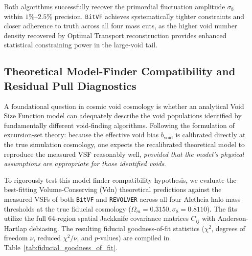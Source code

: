 \documentclass[12pt]{report}
\begin{document}
Both algorithms successfully recover the primordial fluctuation amplitude $\sigma_8$ within $1\%$--$2.5\%$ precision. \texttt{BitVF} achieves systematically tighter constraints and closer adherence to truth across all four mass cuts, as the higher void number density recovered by Optimal Transport reconstruction provides enhanced statistical constraining power in the large-void tail.

\subsection{Theoretical Model-Finder Compatibility and Residual Pull Diagnostics}
\label{sec:model_finder_compatibility}

A foundational question in cosmic void cosmology is whether an analytical Void Size Function model can adequately describe the void populations identified by fundamentally different void-finding algorithms. Following the formulation of excursion-set theory: because the effective void bias $b_{\mathrm{void}}$ is calibrated directly at the true simulation cosmology, one expects the recalibrated theoretical model to reproduce the measured VSF reasonably well, \emph{provided that the model's physical assumptions are appropriate for those identified voids}.

To rigorously test this model-finder compatibility hypothesis, we evaluate the best-fitting \citet{Jennings2013} Volume-Conserving (Vdn) theoretical predictions against the measured VSFs of both \texttt{BitVF} and \texttt{REVOLVER} across all four Aletheia halo mass thresholds at the true fiducial cosmology ($\Omega_m = 0.3150, \sigma_8 = 0.8110$). The fits utilize the full 64-region spatial Jackknife covariance matrices $C_{ij}$ with Anderson-Hartlap debiasing. The resulting fiducial goodness-of-fit statistics ($\chi^2$, degrees of freedom $\nu$, reduced $\chi^2/\nu$, and $p$-values) are compiled in Table~\ref{tab:fiducial_goodness_of_fit}.
\end{document}
